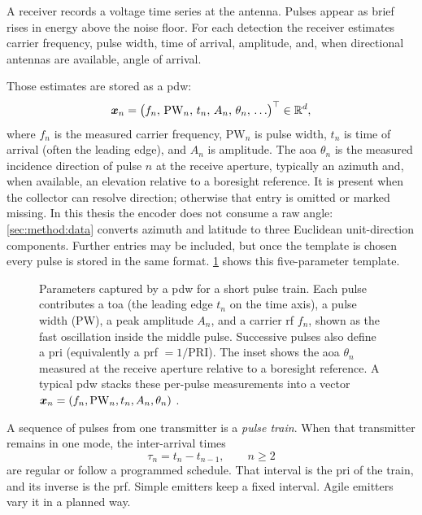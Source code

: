 A receiver records a voltage time series at the antenna.
Pulses appear as brief rises in energy above the noise floor.
For each detection the receiver estimates carrier frequency, pulse width, time of arrival, amplitude, and, when directional antennas are available, angle of arrival.

Those estimates are stored as a \gls{pdw}:
\begin{equation}\label{eq:bg:pdw_vector}
  \bm{x}_n
  =
  \bigl(
    f_n,\,
    \mathrm{PW}_n,\,
    t_n,\,
    A_n,\,
    \theta_n,\,
    \ldots
  \bigr)^{\top}
  \in \mathbb{R}^{d},
\end{equation}
where $f_n$ is the measured carrier frequency, $\mathrm{PW}_n$ is pulse width, $t_n$ is time of arrival (often the leading edge), and $A_n$ is amplitude.
The \gls{aoa} $\theta_n$ is the measured incidence direction of pulse $n$ at the receive aperture, typically an azimuth and, when available, an elevation relative to a boresight reference.
It is present when the collector can resolve direction; otherwise that entry is omitted or marked missing.
In this thesis the encoder does not consume a raw angle: \cref{sec:method:data} converts azimuth and latitude to three Euclidean unit-direction components.
Further entries may be included, but once the template is chosen every pulse is stored in the same format.
\cref{fig:bg:pdw} shows this five-parameter template.

\begin{figure}[!ht]
  \centering
  
  \caption{Parameters captured by a \gls{pdw} for a short pulse train. Each pulse contributes a \gls{toa} (the leading edge $t_n$ on the time axis), a pulse width (PW), a peak amplitude $A_n$, and a carrier \gls{rf} $f_n$, shown as the fast oscillation inside the middle pulse. Successive pulses also define a \gls{pri} (equivalently a \gls{prf} $=1/\mathrm{PRI}$). The inset shows the \gls{aoa} $\theta_n$ measured at the receive aperture relative to a boresight reference. A typical \gls{pdw} stacks these per-pulse measurements into a vector $\bm{x}_n = (f_n, \mathrm{PW}_n, t_n, A_n, \theta_n)$ \parencite{wiley2006elint}.}
  \label{fig:bg:pdw}
\end{figure}

A sequence of pulses from one transmitter is a \emph{pulse train}.
When that transmitter remains in one mode, the inter-arrival times
\begin{equation}\label{eq:bg:pdw_pri}
  \tau_n = t_n - t_{n-1}, \qquad n \ge 2
\end{equation}
are regular or follow a programmed schedule.
That interval is the \gls{pri} of the train, and its inverse is the \gls{prf}.
Simple emitters keep a fixed interval. Agile emitters vary it in a planned way.

